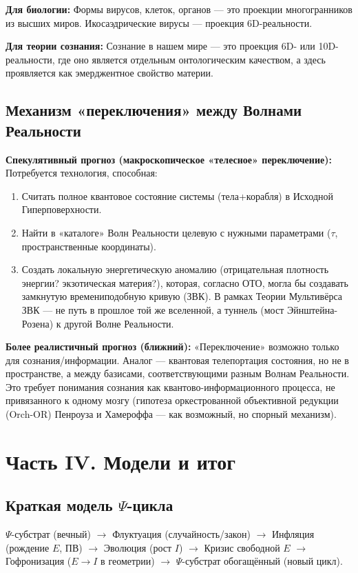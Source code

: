 \documentclass[a4paper,12pt]{article}
\begin{document}
\textbf{Для биологии:} Формы вирусов, клеток, органов — это проекции многогранников из высших миров. Икосаэдрические вирусы — проекция 6D-реальности.

\textbf{Для теории сознания:} Сознание в нашем мире — это проекция 6D- или 10D-реальности, где оно является отдельным онтологическим качеством, а здесь проявляется как эмерджентное свойство материи.

\subsection{Механизм «переключения» между Волнами Реальности}

\textbf{Спекулятивный прогноз (макроскопическое «телесное» переключение):} Потребуется технология, способная:
\begin{enumerate}
	\item Считать полное квантовое состояние системы (тела+корабля) в Исходной Гиперповерхности.
	\item Найти в «каталоге» Волн Реальности целевую с нужными параметрами ($\tau$, пространственные координаты).
	\item Создать локальную энергетическую аномалию (отрицательная плотность энергии? экзотическая материя?), которая, согласно ОТО, могла бы создавать замкнутую времениподобную кривую (ЗВК). В рамках Теории Мультивёрса ЗВК — не путь в прошлое той же вселенной, а туннель (мост Эйнштейна-Розена) к другой Волне Реальности.
\end{enumerate}

\textbf{Более реалистичный прогноз (ближний):} «Переключение» возможно только для сознания/информации. Аналог — квантовая телепортация состояния, но не в пространстве, а между базисами, соответствующими разным Волнам Реальности. Это требует понимания сознания как квантово-информационного процесса, не привязанного к одному мозгу (гипотеза оркестрованной объективной редукции (Orch-OR) Пенроуза и Хамероффа — как возможный, но спорный механизм).

\newpage
\section{Часть IV. Модели и итог}

\subsection{Краткая модель $\Psi$-цикла}

$\Psi$-субстрат (вечный) $\to$ Флуктуация (случайность/закон) $\to$ Инфляция (рождение $E$, ПВ) $\to$ Эволюция (рост $I$) $\to$ Кризис свободной $E$ $\to$ Гофронизация ($E \to I$ в геометрии) $\to$ $\Psi$-субстрат обогащённый (новый цикл).
\end{document}
